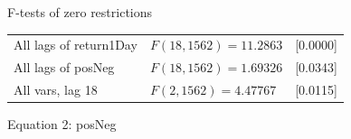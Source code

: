 \begin{center}
F-tests of zero restrictions\\[1em]
\begin{tabular}{lll}
All lags of return1Day & $F(18, 1562) = 11.2863$ & [0.0000]\\
All lags of posNeg & $F(18, 1562) = 1.69326$ & [0.0343]\\
All vars, lag 18 & $F(2, 1562) = 4.47767$ & [0.0115]\\
\end{tabular}
\end{center}

\clearpage

\begin{center}

Equation 2: posNeg\\

\vspace{1em}


\end{center}
